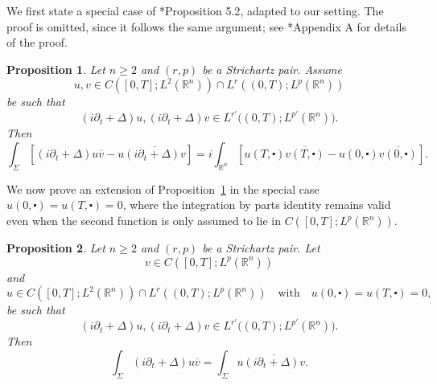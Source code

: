\documentclass[11pt,a4paper]{amsart}
\newtheorem{proposition}{Proposition}[section]
\theoremstyle{remark}
\theoremstyle{definition}
\newcommand{\R}{\mathbb{R}}
\def\ovl{\overline}
\def\cd{\centerdot}
\begin{document}
We first state a special case of \cite{caro2025initialtofinalstateinverseproblemunbounded}*{Proposition 5.2}, adapted to our setting. The proof is omitted, since it follows the same argument; see \cite{caro2025initialtofinalstateinverseproblemunbounded}*{Appendix A} for details of the proof.

\begin{proposition}\label{prp:integration_by_parts_unbounded_no-endpoint}\sl Let $n\geq 2$ and $(r,p)$ be a Strichartz pair. Assume
\[
u,v \in C\left ([0,T];L^2(\R^n)\right) \cap L^r\left((0,T);L^p(\R^n)\right)
\]
be such that
\[
(i\partial_t+\Delta)u, (i\partial_t+\Delta)v \in L^{r'}\big((0,T);L^{p'}(\R^n)\big).
\]
Then
\[
\int_{\Sigma} \left[(i\partial_t+\Delta)u \ovl v - u \ovl{(i\partial_t+\Delta)v}\right] = i \int_{\R^n} \left[u(T,\cd)\ovl{v(T,\cd)}-u(0,\cd)\ovl{v(0,\cd)}\right].
\]
\end{proposition}

We now prove an extension of Proposition~\ref{prp:integration_by_parts_unbounded_no-endpoint} in the special case $u(0,\cd)=u(T,\cd)=0$, where the integration by parts identity remains valid even when the second function is only assumed to lie in $C([0,T];L^{p}(\R^{n}))$.

\begin{proposition}\label{cor:integration_by_parts_unbounded_no-endopint2}\sl
Let $n\geq 2$ and $(r,p)$ be a Strichartz pair. Let
\[
v \in C\left([0,T];L^p(\R^n)\right)
\]
and
\[
u \in C\left([0,T];L^2(\R^n)\right) \cap L^r\left((0,T);L^p(\R^n)\right)\quad\text{with}\quad u(0,\cd)=u(T,\cd)=0,
\]
be such that
\[
\left(i\partial_t+\Delta\right)u, \left(i\partial_t+\Delta\right)v \in L^{r'}\big((0,T);L^{p'}(\R^n)\big).
\]
Then
\[
\int_\Sigma \left(i\partial_t+\Delta\right)u \ovl v = \int_\Sigma u \ovl{\left(i\partial_t+\Delta\right)v}.
\]
\end{proposition}
\end{document}
